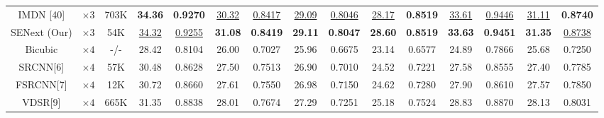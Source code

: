 \documentclass{ieeeaccess}
\begin{document}
\begin{table}
\begin{tabular}{|c|c|c|cc|cc|cc|cc|cc|cc|}
IMDN [40] & $\times3$ &703K& \multicolumn{1}{c|}{\color{red}\textbf{34.36}} & {\color{red}\textbf{0.9270}} & \multicolumn{1}{c|}{\color{blue}\underline{30.32}} &{\color{blue}\underline{0.8417}} & \multicolumn{1}{c|}{\color{blue}\underline{29.09}} & {\color{blue}\underline{0.8046}} & \multicolumn{1}{c|}{\color{blue}\underline{28.17}} & {\color{red}\textbf{0.8519}}& \multicolumn{1}{c|}{\color{blue}\underline{33.61}} &{\color{blue}\underline{0.9446}} &\multicolumn{1}{c|}{\color{blue}\underline{31.11}} & {\color{red}\textbf{0.8740}}\\


SENext (Our) & $\times3$ &54K& \multicolumn{1}{c|}{\color{blue}\underline{34.32}} &{\color{blue}\underline{0.9255}}& \multicolumn{1}{c|}{\color{red}\textbf{31.08}} & {\color{red}\textbf{0.8419}}& \multicolumn{1}{c|}{\color{red}\textbf{29.11}} &{\color{red}\textbf{0.8047}}& \multicolumn{1}{c|}{\color{red}\textbf{28.60}} &{\color{red}\textbf{0.8519}}& \multicolumn{1}{c|}{\color{red}\textbf{33.63}} &{\color{red}\textbf{0.9451}} &\multicolumn{1}{c|}{\color{red}\textbf{31.35}} &{\color{blue}\underline{0.8738}}\\

\hline

Bicubic&$\times4$ &-/-& \multicolumn{1}{c|}{28.42 } &0.8104 & \multicolumn{1}{c|}{26.00  } &0.7027& \multicolumn{1}{c|}{25.96 } & 0.6675  & \multicolumn{1}{c|}{23.14 } & 0.6577  & \multicolumn{1}{c|}{24.89} &0.7866

&\multicolumn{1}{c|}{25.68} &0.7250\\


SRCNN[6] & $\times4$  &57K& \multicolumn{1}{c|}{30.48 } &0.8628   & \multicolumn{1}{c|}{27.50 } &0.7513  &\multicolumn{1}{c|}{ 26.90 } & 0.7010 & \multicolumn{1}{c|}{24.52 } &0.7221 & \multicolumn{1}{c|}{27.58 } &0.8555
&\multicolumn{1}{c|}{ 27.40} &0.7785 \\


FSRCNN[7]& $\times4$ &12K& \multicolumn{1}{c|}{30.72} & 0.8660& \multicolumn{1}{c|}{27.61} &0.7550  &\multicolumn{1}{c|}{26.98} &0.7150 & \multicolumn{1}{c|}{24.62} &0.7280 & \multicolumn{1}{c|}{27.90 } &0.8610
&\multicolumn{1}{c|}{27.57} &0.7850 \\


VDSR[9]& $\times4$ &665K & \multicolumn{1}{c|}{31.35} &0.8838 & \multicolumn{1}{c|}{28.01} & 0.7674&\multicolumn{1}{c|}{27.29} &0.7251 & \multicolumn{1}{c|}{25.18} &0.7524 & \multicolumn{1}{c|}{28.83 } & 0.8870
&\multicolumn{1}{c|}{28.13} &0.8031 \\




\end{tabular}
\end{table}
\end{document}
